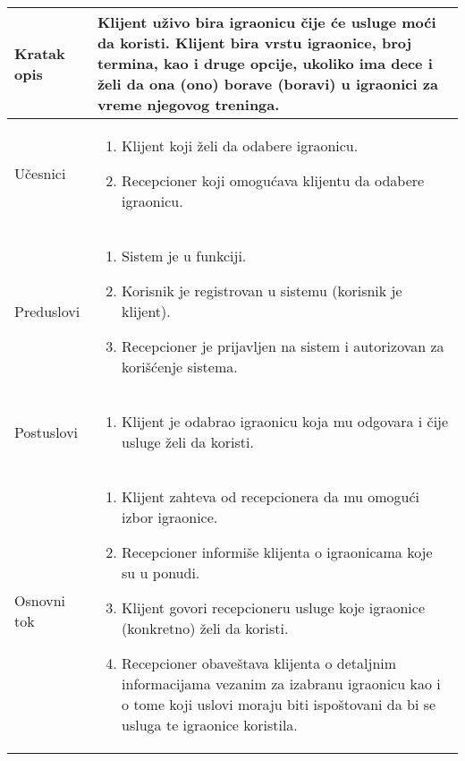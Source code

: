 \documentclass[../../main.tex]{subfiles}
\begin{document}
\begin{longtable}{| p{} | p{} |} 
\hline
    Kratak opis & Klijent uživo bira igraonicu čije će usluge moći da koristi. Klijent bira vrstu igraonice, broj termina, kao i druge opcije, ukoliko ima dece i želi da ona (ono) borave (boravi) u igraonici za vreme njegovog treninga. \\ 
\hline
    Učesnici &
    \begin{enumerate}
        \item Klijent koji želi da odabere igraonicu.
        \item Recepcioner koji omogućava klijentu da odabere igraonicu.
    \end{enumerate}\\
\hline
   Preduslovi &
    \begin{enumerate}
        \item Sistem je u funkciji.
        \item Korisnik je registrovan u sistemu (korisnik je klijent).
        \item Recepcioner je prijavljen na sistem i autorizovan za korišćenje sistema.
    \end{enumerate}\\
\hline  
    Postuslovi & 
    \begin{enumerate}
         \item Klijent je odabrao igraonicu koja mu odgovara i čije usluge želi da koristi.
    \end{enumerate} \\
\hline
    Osnovni tok & 
    \begin{enumerate}
        \item Klijent zahteva od recepcionera da mu omogući izbor igraonice.
        \item Recepcioner informiše klijenta o igraonicama koje su u ponudi.
        \item Klijent govori recepcioneru usluge koje igraonice (konkretno) želi da koristi.
        \item Recepcioner obaveštava klijenta o detaljnim informacijama vezanim za izabranu igraonicu kao i o tome koji uslovi moraju biti ispoštovani da bi se usluga te igraonice koristila.

\end{enumerate}
\end{longtable}
\end{document}
